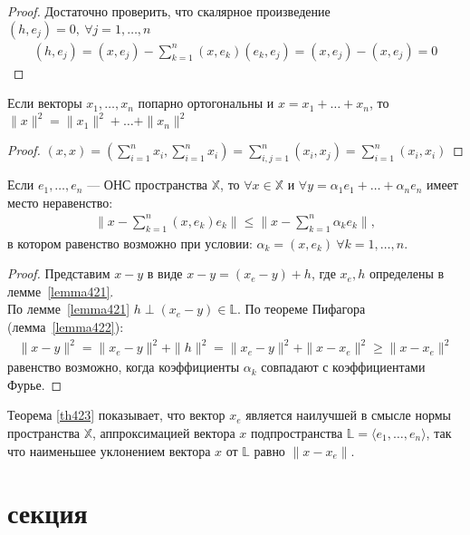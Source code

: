 \begin{proof}
  Достаточно проверить, что скалярное произведение \\ $(h, e_j) = 0, \ \forall j =
  1, \dots, n$
  \begin{gather*}
    (h, e_j) = (x, e_j) - \sum\limits_{k = 1}^{n} (x, e_k) (e_k, e_j) =
    (x, e_j) - (x, e_j) = 0
  \end{gather*}
\end{proof}

\begin{lemma}
  \label{lemma422}
  Если векторы $x_1, \dots, x_n$ попарно ортогональны и $x = x_1 + \dots +
  x_n$, то $\|x\|^2 = \|x_1\|^2 + \dots + \|x_n\|^2$
\end{lemma}

\begin{proof}
  $(x, x) = (\sum\limits_{i = 1}^{n} x_i, \sum\limits_{i = 1}^{n} x_i) =
  \sum\limits_{i, j = 1}^{n} (x_i, x_j) = \sum\limits_{i = 1}^{n} (x_i, x_i)$
\end{proof}

\begin{theorem}
  \label{th423}
  Если $e_1, \dots, e_n$ --- ОНС пространства $\mathbb{X}$, то $\forall x \in
  \mathbb{X}$ и $\forall y = \alpha_1 e_1 + \dots + \alpha_n e_n$ имеет место
  неравенство:
  \begin{gather*}
    \|x - \sum\limits_{k = 1}^{n} (x, e_k) e_k \| \leq \|x - \sum\limits_{k =
    1}^{n} \alpha_k e_k \|,
  \end{gather*}
  в котором равенство возможно при условии: $\alpha_k = (x, e_k) \ \forall k = 1,
  \dots, n$.
\end{theorem}

\begin{proof}
  Представим $x - y$ в виде $x - y = (x_e - y) + h$, где $x_e, h$ определены в
  лемме~\eqref{lemma421}. \\
  По лемме~\eqref{lemma421} $h \perp (x_e - y) \in \mathbb{L}$. По теореме
  Пифагора (лемма~\ref{lemma422}):
  \begin{gather*}
    \|x - y\|^2 = \|x_e - y\|^2 + \|h\|^2 = \|x_e - y\|^2 + \|x - x_e\|^2 \geq
    \|x - x_e\|^2
  \end{gather*}
  равенство возможно, когда коэффициенты $\alpha_k$ совпадают с коэффициентами
  Фурье.
\end{proof}

\begin{remark}
  Теорема \eqref{th423} показывает, что вектор $x_e$ является наилучшей в
  смысле нормы пространства $\mathbb{X}$, аппроксимацией вектора $x$
  подпространства $\mathbb{L} = \langle e_1, \dots, e_n \rangle$, так что
  наименьшее уклонением вектора $x$ от $\mathbb{L}$ равно $\|x - x_e\|$.
\end{remark}

\section{секция}
\label{ch43}
